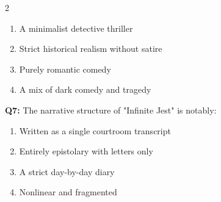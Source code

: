 \documentclass[10pt]{article}
\begin{document}
\begin{multicols}{2}
\begin{enumerate}[label=\arabic*.]
\item A minimalist detective thriller
\item Strict historical realism without satire
\item Purely romantic comedy
\item A mix of dark comedy and tragedy
\end{enumerate}
\textbf{Q7:} The narrative structure of "Infinite Jest" is notably:

\begin{enumerate}[label=\arabic*.]
\item Written as a single courtroom transcript
\item Entirely epistolary with letters only
\item A strict day-by-day diary
\item Nonlinear and fragmented
\end{enumerate}
\end{multicols}

\newpage
\end{document}
